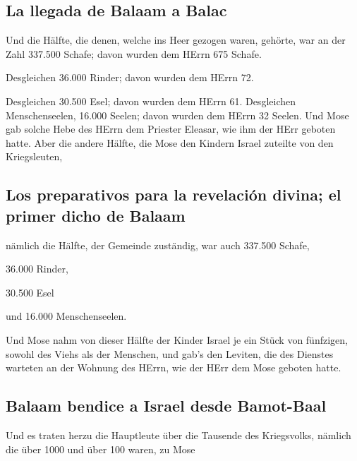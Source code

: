 \hypertarget{la-llegada-de-balaam-a-balac}{%
\subsection{La llegada de Balaam a
Balac}\label{la-llegada-de-balaam-a-balac}}

 Und die Hälfte, die denen, welche ins Heer gezogen
waren, gehörte, war an der Zahl 337.500 Schafe;  davon
wurden dem HErrn 675 Schafe.

 Desgleichen 36.000 Rinder; davon wurden dem HErrn 72.

 Desgleichen 30.500 Esel; davon wurden dem HErrn 61.
 Desgleichen Menschenseelen, 16.000 Seelen; davon wurden
dem HErrn 32 Seelen.  Und Mose gab solche Hebe des HErrn
dem Priester Eleasar, wie ihm der HErr geboten hatte. 
Aber die andere Hälfte, die Mose den Kindern Israel zuteilte von den
Kriegsleuten,

\hypertarget{los-preparativos-para-la-revelaciuxf3n-divina-el-primer-dicho-de-balaam}{%
\subsection{Los preparativos para la revelación divina; el primer dicho
de
Balaam}\label{los-preparativos-para-la-revelaciuxf3n-divina-el-primer-dicho-de-balaam}}

 nämlich die Hälfte, der Gemeinde zuständig, war auch
337.500 Schafe,

 36.000 Rinder,

 30.500 Esel

 und 16.000 Menschenseelen.

 Und Mose nahm von dieser Hälfte der Kinder Israel je ein
Stück von fünfzigen, sowohl des Viehs als der Menschen, und gab's den
Leviten, die des Dienstes warteten an der Wohnung des HErrn, wie der
HErr dem Mose geboten hatte.

\hypertarget{balaam-bendice-a-israel-desde-bamot-baal}{%
\subsection{Balaam bendice a Israel desde
Bamot-Baal}\label{balaam-bendice-a-israel-desde-bamot-baal}}

 Und es traten herzu die Hauptleute über die Tausende des
Kriegsvolks, nämlich die über 1000 und über 100 waren, zu Mose

